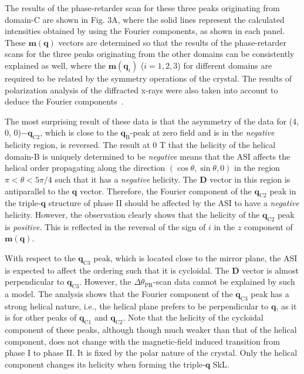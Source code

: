 \documentclass[aps,prb,reprint,superscriptaddress,amsmath,amssymb]{revtex4-2}
\begin{document}
The results of the phase-retarder scan for these three peaks originating from domain-C are shown in Fig. 3A, where the solid lines represent the calculated intensities obtained by using the Fourier components, as shown in each panel. 
These $\bm{m}(\bm{q})$ vectors are determined so that the results of the phase-retarder scans for the three peaks originating from the other domains can be consistently explained as well, where the $\bm{m}(\bm{q}_i)$ ($i=1,2,3$) for different domains are required to be related by the symmetry operations of the crystal. The results of polarization analysis of the diffracted x-rays were also taken into account to deduce the Fourier components~\cite{SM}. 

The most surprising result of these data is that the asymmetry of the data for (4, 0, 0)$-\bm{q}_{\text{C2}}$, which is close to the  $\bm{q}_{\text{B}}$-peak at zero field and is in the \textit{negative} helicity region, is reversed. 
The result at 0 T that the helicity of the helical domain-B is uniquely determined to be \textit{negative} means that the ASI affects the helical order propagating along the direction $(\cos\theta, \sin\theta, 0)$ in the region $\pi < \theta < 5\pi/4$ such that it has a \textit{negative} helicity. 
The $\bm{D}$ vector in this region is antiparallel to the $\bm{q}$ vector. 
Therefore, the Fourier component of the $\bm{q}_{\text{C2}}$ peak in the triple-$\bm{q}$ structure of phase II should be affected by the ASI to have a \textit{negative} helicity. 
However, the observation clearly shows that the helicity of the $\bm{q}_{\text{C2}}$ peak is \textit{positive}. 
This is reflected in the reversal of the sign of $i$ in the $z$ component of $\bm{m}(\bm{q})$. 

With respect to the $\bm{q}_{\text{C3}}$ peak, which is located close to the mirror plane, the ASI is expected to affect the ordering such that it is cycloidal. 
The $\bm{D}$ vector is almost perpendicular to $\bm{q}_{\text{C3}}$. 
However, the $\Delta\theta_{\text{PR}}$-scan data cannot be explained by such a model. The analysis shows that the Fourier component of the $\bm{q}_{\text{C3}}$ peak has a strong helical nature, i.e., the helical plane prefers to be perpendicular to $\bm{q}$, as it is for other peaks of $\bm{q}_{\text{C1}}$ and $\bm{q}_{\text{C2}}$. 
Note that the helicity of the cycloidal component of these peaks, although though much weaker than that of the helical component, does not change with the magnetic-field induced transition from phase I to phase II. It is fixed by the polar nature of the crystal.
Only the helical component changes its helicity when forming the triple-$\bm{q}$ SkL. 
\end{document}
